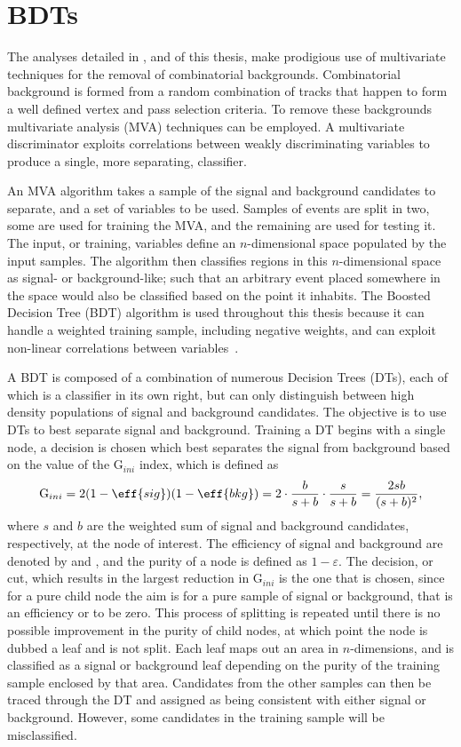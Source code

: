 \chapter{BDTs}

The analyses detailed in ,  and  of this thesis, make
prodigious use of multivariate techniques for the removal of combinatorial backgrounds.
Combinatorial background is formed from a random combination of tracks that happen to form a well
defined vertex and pass selection criteria.
To remove these backgrounds multivariate analysis (MVA) techniques can be employed.
A multivariate discriminator exploits correlations between weakly discriminating variables to
produce a single, more separating, classifier.

An MVA algorithm takes a sample of the signal and background candidates to separate, and a set of
variables to be used.
Samples of events are split in two, some are used for training the MVA, and the remaining are used
for testing it.
The input, or training, variables define an $n$-dimensional space populated by the input samples.
The algorithm then classifies regions in this $n$-dimensional space as signal- or background-like;
such that an arbitrary event placed somewhere in the space would also be classified based on the
point it inhabits.
The Boosted Decision Tree (BDT) algorithm is used throughout this thesis because it can handle
a weighted training sample, including negative weights, and can exploit non-linear correlations
between variables~\cite{Breiman,Roe}.

A BDT is composed of a combination of numerous Decision Trees (DTs), each of which is a classifier
in its own right, but can only distinguish between high density populations of signal and
background candidates.
The objective is to use DTs to best separate signal and background.
Training a DT begins with a single node, a decision is chosen which best separates the signal from
background based on the value of the $\mathrm{G}_{ini}$ index, which is defined as
\begin{equation}
  \mathrm{G}_{ini} = 2(1-\eff{sig})(1-\eff{bkg}) = 2\cdot\frac{b}{s+b}\cdot\frac{s}{s+b}
  = \frac{2sb}{(s+b)^2},
\end{equation}
where $s$ and $b$ are the weighted sum of signal and background candidates, respectively, at the
node of interest.
The efficiency of signal and background are denoted by  and , and the purity of a
node is defined as $1-\varepsilon$.
The decision, or cut, which results in the largest reduction in $\mathrm{G}_{ini}$ is the one that
is chosen, since for a pure child node the aim is for a pure sample of signal or background, that
is an efficiency  or  to be zero.
This process of splitting is repeated until there is no possible improvement in the purity of child
nodes, at which point the node is dubbed a leaf and is not split.
Each leaf maps out an area in $n$-dimensions, and is classified as a signal or background leaf
depending on the purity of the training sample enclosed by that area.
Candidates from the other samples can then be traced through the DT and assigned as being
consistent with either signal or background.
However, some candidates in the training sample will be misclassified.

